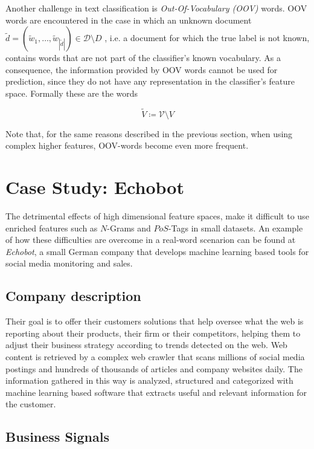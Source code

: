 Another challenge in text classification is \emph{Out-Of-Vocabulary
(OOV)} words. OOV words are encountered in the case in which an unknown document
$\tilde{d} = (\tilde{w}_1, \ldots, \tilde{w}_{|\tilde{d}|}) \in
\mathcal{D}\setminus D$ , i.e.
a document for which the true label is not known, contains words that are not
part of the classifier's known vocabulary.
As a consequence, the information provided by OOV words cannot be used for
prediction, since they do not have any representation in the classifier's feature
space. Formally these are the words

\begin{equation*}
\tilde{V} \coloneqq \mathcal{V} \setminus V
\end{equation*}

Note that, for the same reasons described in the previous section, when using
complex higher features, OOV-words become even more frequent.

\section{Case Study: Echobot}
\label{sec:echobot}

The detrimental effects of high dimensional feature spaces, make it difficult to
use enriched features such as $N$-Grams and $PoS$-Tags in small datasets.
An example of how these difficulties are overcome in a real-word scenarion
can be found at \textit{Echobot}, a small German company that develops machine
learning based tools for social media monitoring and sales.

\subsection{Company description}
Their goal is to offer their customers solutions that
help oversee what the web is reporting about their products, their firm or
their competitors, helping them to adjust their business strategy according
to trends detected on the web. Web content is retrieved by a complex web crawler
that scans millions of social media postings and hundreds of thousands
of articles and company websites daily. The information gathered in this way is
analyzed, structured and categorized with machine learning based software that
extracts useful and relevant information for the customer.

\subsection{Business Signals}


